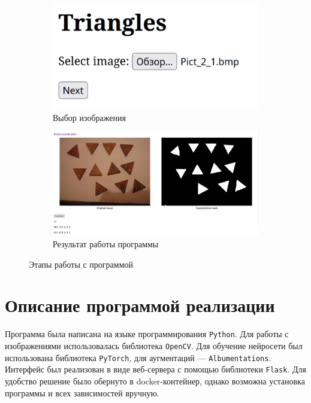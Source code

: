 \documentclass[11pt]{extarticle}
\begin{document}
\begin{figure}[h]
  \centering
  \begin{subfigure}[b]{0.3\textwidth}
    \includegraphics[width=\textwidth]{server1}
    \caption{Выбор изображения}
  \end{subfigure}
  \begin{subfigure}[b]{0.7\textwidth}
    \includegraphics[width=\textwidth]{server2}
    \caption{Результат работы программы}
  \end{subfigure}
  \caption{Этапы работы с программой}
  \label{fig:program}
\end{figure}

\section{Описание программой реализации}
Программа была написана на языке программирования \verb|Python|. Для работы с изображениями использовалась библиотека \verb|OpenCV|. Для обучение нейросети был использована библиотека \verb|PyTorch|, для аугментаций --- \verb|Albumentations|. Интерфейс был реализован в виде веб-сервера с помощью библиотеки \verb|Flask|. Для удобство решение было обернуто в docker-контейнер, однако возможна установка программы и всех зависимостей вручную.
\end{document}
